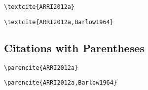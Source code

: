 \begin{lstlisting}[caption={Citation for Single Author.}]
\textcite{ARRI2012a}
\end{lstlisting}

\textcite{ARRI2012a}

\begin{lstlisting}[caption={Citation for Multiple Authors.}]
\textcite{ARRI2012a,Barlow1964}
\end{lstlisting}

\textcite{ARRI2012a,Barlow1964}

\subsection*{Citations with Parentheses}

\begin{lstlisting}[caption={Citation with Parentheses for Single Author.}]
\parencite{ARRI2012a}
\end{lstlisting}

\parencite{ARRI2012a}

\begin{lstlisting}[caption={Citation with Parentheses for Multiple Authors.}s]
\parencite{ARRI2012a,Barlow1964}
\end{lstlisting}

\parencite{ARRI2012a,Barlow1964}
